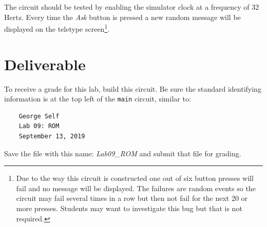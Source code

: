 The circuit should be tested by enabling the simulator clock at a frequency of 32 Hertz. Every time the \textit{Ask} button is pressed a new random message will be displayed on the teletype screen\footnote{Due to the way this circuit is constructed one out of six button presses will fail and no message will be displayed. The failures are random events so the circuit may fail several times in a row but then not fail for the next 20 or more presses. Students may want to investigate this bug but that is not required.}.

\section{Deliverable}

To receive a grade for this lab, build this circuit. Be sure the standard identifying information is at the top left of the \lstinline{main} circuit, similar to: 

\bigskip
\begin{minipage}{\linewidth}
	\begin{verbatim}
	George Self
	Lab 09: ROM
	September 13, 2019
	\end{verbatim}
\end{minipage}
\bigskip

Save the file with this name: \textit{Lab09\_ROM} and submit that file for grading.

